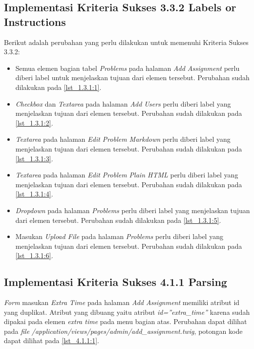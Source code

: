 \subsection{Implementasi Kriteria Sukses 3.3.2 Labels or Instructions}
\label{subsec:implementasi_A_3.3.2}

Berikut adalah perubahan yang perlu dilakukan untuk memenuhi Kriteria Sukses 3.3.2:

\begin{itemize}
	\item Semua elemen bagian tabel \textit{Problems} pada halaman \textit{Add Assignment} perlu diberi label untuk menjelaskan tujuan dari elemen tersebut. Perubahan sudah dilakukan pada \ref{lst_1.3.1:1}.
	
	\item \textit{Checkbox} dan \textit{Textarea} pada halaman \textit{Add Users} perlu diberi label yang menjelaskan tujuan dari elemen tersebut. Perubahan sudah dilakukan pada \ref{lst_1.3.1:2}.
	
	\item \textit{Textarea} pada halaman \textit{Edit Problem Markdown} perlu diberi label yang menjelaskan tujuan dari elemen tersebut. Perubahan sudah dilakukan pada \ref{lst_1.3.1:3}.
	
	\item \textit{Textarea} pada halaman \textit{Edit Problem Plain HTML} perlu diberi label yang menjelaskan tujuan dari elemen tersebut. Perubahan sudah dilakukan pada \ref{lst_1.3.1:4}.
	
	\item \textit{Dropdown} pada halaman \textit{Problems} perlu diberi label yang menjelaskan tujuan dari elemen tersebut. Perubahan sudah dilakukan pada \ref{lst_1.3.1:5}.
	
	\item Masukan \textit{Upload File} pada halaman \textit{Problems} perlu diberi label yang menjelaskan tujuan dari elemen tersebut. Perubahan sudah dilakukan pada \ref{lst_1.3.1:6}.
\end{itemize}

\subsection{Implementasi Kriteria Sukses 4.1.1 Parsing}
\label{subsec:implementasi_A_4.1.1}

\textit{Form} masukan \textit{Extra Time} pada halaman \textit{Add Assignment} memiliki atribut id yang duplikat. Atribut yang dibuang yaitu atribut \textit{id=''extra\_time''} karena sudah dipakai pada elemen \textit{extra time} pada menu bagian atas. Perubahan dapat dilihat pada \textit{file} \textit{/application/views/pages/admin/add\_assignment.twig}, potongan kode dapat dilihat pada \ref{lst_4.1.1:1}.

